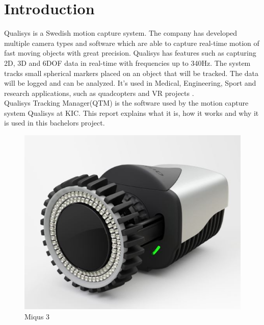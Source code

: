 \section*{Introduction}

Qualisys is a Swedish motion capture system. The company has developed multiple camera types and software which are able to capture real-time motion of fast moving objects with great precision. Qualisys has features such as capturing 2D, 3D and 6DOF data in real-time with frequencies up to 340Hz. The system tracks small spherical markers placed on an object that will be tracked. The data will be logged and can be analyzed. It’s used in Medical, Engineering, Sport and research applications, such as quadcopters and VR projects \cite{QTM}.
\\
Qualisys Tracking Manager(QTM) is the software used by the motion capture system Qualisys at KIC. This report explains what it is, how it works and why it is used in this bachelors project. \\

\begin{figure}[h]
          \centering
            \includegraphics[scale = 0.33]{VAPIQ-PICTURES/m3}
                \caption{Miqus 3}
                \label{m3}
            \label{dir}
\end{figure}


